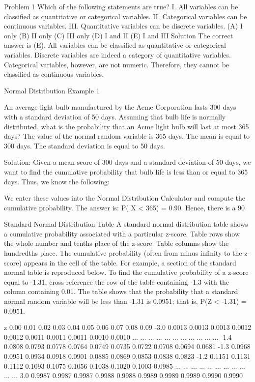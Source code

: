 Problem 1
Which of the following statements are true?
I. All variables can be classified as quantitative or categorical variables. 
II. Categorical variables can be continuous variables. 
III. Quantitative variables can be discrete variables.
(A) I only 
(B) II only 
(C) III only 
(D) I and II 
(E) I and III
Solution
The correct answer is (E). All variables can be classified as quantitative or categorical variables. Discrete variables are indeed a category of quantitative variables. Categorical variables, however, are not numeric. Therefore, they cannot be classified as continuous variables.

Normal Distribution Example 1

An average light bulb manufactured by the Acme Corporation lasts 300 days with a standard deviation of 50 days. Assuming that bulb life is normally distributed, what is the probability that an Acme light bulb will last at most 365 days?
The value of the normal random variable is 365 days.
The mean is equal to 300 days.
The standard deviation is equal to 50 days.




Solution: Given a mean score of 300 days and a standard deviation of 50 days, we want to find the cumulative probability that bulb life is less than or equal to 365 days. Thus, we know the following:

We enter these values into the Normal Distribution Calculator and compute the cumulative probability. The answer is: P( X < 365) = 0.90. Hence, there is a 90%


Standard Normal Distribution Table
A standard normal distribution table shows a cumulative probability associated with a particular z-score. Table rows show the whole number and tenths place of the z-score. Table columns show the hundredths place. The cumulative probability (often from minus infinity to the z-score) appears in the cell of the table.
For example, a section of the standard normal table is reproduced below. To find the cumulative probability of a z-score equal to -1.31, cross-reference the row of the table containing -1.3 with the column containing 0.01. The table shows that the probability that a standard normal random variable will be less than -1.31 is 0.0951; that is, P(Z < -1.31) = 0.0951.

z
0.00
0.01
0.02
0.03
0.04
0.05
0.06
0.07
0.08
0.09
-3.0
0.0013
0.0013
0.0013
0.0012
0.0012
0.0011
0.0011
0.0011
0.0010
0.0010
...
...
...
...
...
...
...
...
...
...
...
-1.4
0.0808
0.0793
0.0778
0.0764
0.0749
0.0735
0.0722
0.0708
0.0694
0.0681
-1.3
0.0968
0.0951
0.0934
0.0918
0.0901
0.0885
0.0869
0.0853
0.0838
0.0823
-1.2
0.1151
0.1131
0.1112
0.1093
0.1075
0.1056
0.1038
0.1020
0.1003
0.0985
...
...
...
...
...
...
...
...
...
...
...
3.0
0.9987
0.9987
0.9987
0.9988
0.9988
0.9989
0.9989
0.9989
0.9990
0.9990

